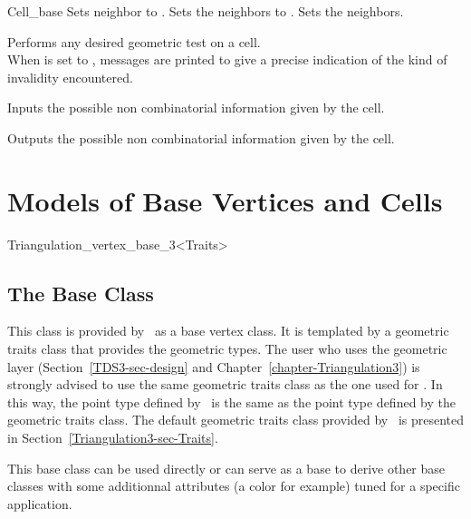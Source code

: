 \begin{ccClass}{Cell_base}
{Sets neighbor  to .
}
\ccGlue
{} 
{Sets the neighbors to .}
\ccGlue
{}
{Sets the neighbors.}

{Performs any desired geometric test on a cell.\\
When  is set to , messages are printed to give
a precise indication of the kind of invalidity encountered.}


{Inputs the possible non combinatorial information given by the cell.
}

{Outputs the possible non combinatorial information given by the cell.
}

	\end{ccClass} 

\section{Models of Base Vertices and Cells}
\label{TDS3-sec-class-Base}

	\begin{ccClassTemplate}{Triangulation_vertex_base_3<Traits>}
	\subsection{The Base Class \protect {} }
	\label{TDS3-sec-class-Base_Vertex}

This class is provided by \cgal\ as a base vertex class. It is
templated by a geometric traits class  that provides the
geometric types. The user who uses the geometric layer
(Section~\ref{TDS3-sec-design} and 
Chapter~\ref{chapter-Triangulation3}) is strongly advised to use the
same geometric traits class  as the one used for
. In this way, the point type
defined by \ccClassTemplateName\ is the same as the point type defined by the
geometric traits class. The default geometric traits class provided by 
\cgal\ is presented in Section~\ref{Triangulation3-sec-Traits}.

This base class can be used directly or can serve as a base to derive
other base classes with some additionnal attributes (a color for
example) tuned for a specific application.


	\end{ccClassTemplate} 

